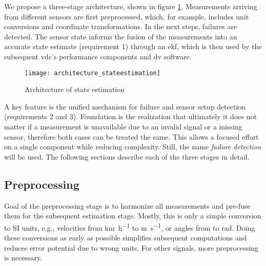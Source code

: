 We propose a three-stage architecture, shown in figure \ref{fig:architecture-stateestimation}. Measurements arriving from different sensors are first preprocessed, which, for example, includes unit conversions and coordinate transformations. In the next steps, failures are detected. The sensor state informs the fusion of the measurements into an accurate state estimate (requirement 1) through an \gls{ekf}, which is then used by the subsequent \gls{vdc}'s performance components and \gls{dv} software.

\begin{figure}
	\centering
	\texttt{[image: architecture\_stateestimation]}%
	\caption{Architecture of state estimation}
	\label{fig:architecture-stateestimation}
\end{figure}

A key feature is the unified mechanism for failure and sensor setup detection (requirements 2 and 3). Foundation is the realization that ultimately it does not matter if a measurement is unavailable due to an invalid signal or a missing sensor, therefore both cases can be treated the same. This allows a focused effort on a single component while reducing complexity. Still, the name \textit{failure detection} will be used. The following sections describe each of the three stages in detail.


\subsection{Preprocessing}
Goal of the preprocessing stage is to harmonize all measurements and pre-fuse them for the subsequent estimation stage. Mostly, this is only a simple conversion to SI units, e.g., velocities from \si{\kilo\meter\per\hour} to \si{\meter\per\second}, or angles from \si{\deg} to \si{\radian}. Doing these conversions as early as possible simplifies subsequent computations and reduces error potential due to wrong units. For other signals, more preprocessing is necessary.


